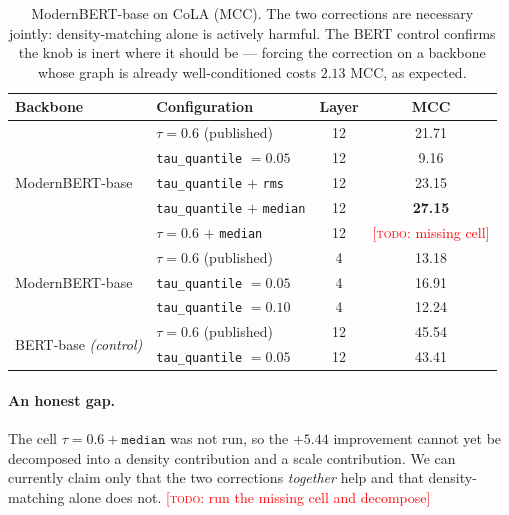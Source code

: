 \documentclass{article} %
\newcommand{\TODO}[1]{\textcolor{red}{[\textsc{todo}: #1]}}
\begin{document}
\begin{table}[t]
\caption{ModernBERT-base on CoLA (MCC). The two corrections are necessary
jointly: density-matching alone is actively harmful. The BERT control confirms
the knob is inert where it should be --- forcing the correction on a backbone
whose graph is already well-conditioned costs $2.13$ MCC, as expected.}
\label{tab:modernbert}
\begin{center}
\begin{tabular}{llcc}
\toprule
Backbone & Configuration & Layer & MCC \\
\midrule
\multirow{5}{*}{ModernBERT-base}
 & $\tau = 0.6$ (published)                    & 12 & 21.71 \\
 & \texttt{tau\_quantile} $= 0.05$             & 12 & \phantom{0}9.16 \\
 & \texttt{tau\_quantile} $+$ \texttt{rms}     & 12 & 23.15 \\
 & \texttt{tau\_quantile} $+$ \texttt{median}  & 12 & \textbf{27.15} \\
 & $\tau = 0.6$ $+$ \texttt{median}            & 12 & \TODO{missing cell} \\
\midrule
\multirow{3}{*}{ModernBERT-base}
 & $\tau = 0.6$ (published)                    & \phantom{0}4 & 13.18 \\
 & \texttt{tau\_quantile} $= 0.05$             & \phantom{0}4 & 16.91 \\
 & \texttt{tau\_quantile} $= 0.10$             & \phantom{0}4 & 12.24 \\
\midrule
\multirow{2}{*}{BERT-base \emph{(control)}}
 & $\tau = 0.6$ (published)                    & 12 & 45.54 \\
 & \texttt{tau\_quantile} $= 0.05$             & 12 & 43.41 \\
\bottomrule
\end{tabular}
\end{center}
\end{table}

\paragraph{An honest gap.} The cell $\tau = 0.6 + \texttt{median}$ was not run,
so the $+5.44$ improvement cannot yet be decomposed into a density
contribution and a scale contribution. We can currently claim only that the
two corrections \emph{together} help and that density-matching alone does not.
\TODO{run the missing cell and decompose}

\end{document}
